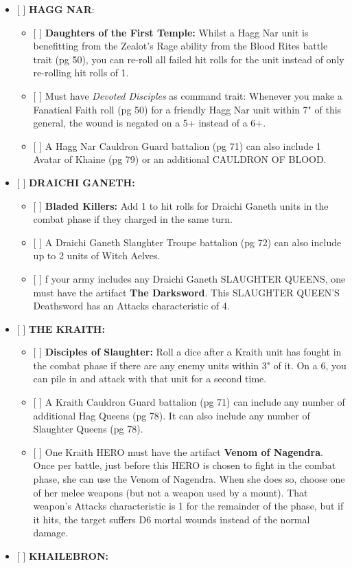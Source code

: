 \begin{itemize}
\tightlist
\item
  {[} {]} \textbf{HAGG NAR}:

  \begin{itemize}
  \tightlist
  \item
    {[} {]} \textbf{Daughters of the First Temple:} Whilst a Hagg Nar
    unit is benefitting from the Zealot's Rage ability from the Blood
    Rites battle trait (pg 50), you can re-roll all failed hit rolls for
    the unit instead of only re-rolling hit rolls of 1.
  \item
    {[} {]} Must have \emph{Devoted Disciples} as command trait:
    Whenever you make a Fanatical Faith roll (pg 50) for a friendly Hagg
    Nar unit within 7" of this general, the wound is negated on a 5+
    instead of a 6+.
  \item
    {[} {]} A Hagg Nar Cauldron Guard battalion (pg 71) can also include
    1 Avatar of Khaine (pg 79) or an additional CAULDRON OF BLOOD.
  \end{itemize}
\item
  {[} {]} \textbf{DRAICHI GANETH:}

  \begin{itemize}
  \tightlist
  \item
    {[} {]} \textbf{Bladed Killers:} Add 1 to hit rolls for Draichi
    Ganeth units in the combat phase if they charged in the same turn.
  \item
    {[} {]} A Draichi Ganeth Slaughter Troupe battalion (pg 72) can also
    include up to 2 units of Witch Aelves.
  \item
    {[} {]} f your army includes any Draichi Ganeth SLAUGHTER QUEENS,
    one must have the artifact \textbf{The Darksword}. This SLAUGHTER
    QUEEN'S Deathsword has an Attacks characteristic of 4.
  \end{itemize}
\item
  {[} {]} \textbf{THE KRAITH:}

  \begin{itemize}
  \tightlist
  \item
    {[} {]} \textbf{Disciples of Slaughter:} Roll a dice after a Kraith
    unit has fought in the combat phase if there are any enemy units
    within 3" of it. On a 6, you can pile in and attack with that unit
    for a second time.
  \item
    {[} {]} A Kraith Cauldron Guard battalion (pg 71) can include any
    number of additional Hag Queens (pg 78). It can also include any
    number of Slaughter Queens (pg 78).
  \item
    {[} {]} One Kraith HERO must have the artifact \textbf{Venom of
    Nagendra}. Once per battle, just before this HERO is chosen to fight
    in the combat phase, she can use the Venom of Nagendra. When she
    does so, choose one of her melee weapons (but not a weapon used by a
    mount). That weapon's Attacks characteristic is 1 for the remainder
    of the phase, but if it hits, the target suffers D6 mortal wounds
    instead of the normal damage.
  \end{itemize}
\item
  {[} {]} \textbf{KHAILEBRON:}


\end{itemize}
